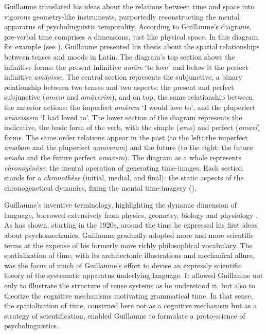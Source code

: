 \documentclass[english,output=paper,colorlinks,citecolor=brown]{../langscibook}
\begin{document}
Guillaume translated his ideas about the relations between time and space into vigorous geometry-like instruments, purportedly reconstructing the mental apparatus of psycholinguistic temporality. According to Guillaume’s diagrams, pre-verbal time comprises \textit{n} dimensions, just like physical space. In this diagram, for example (see ), Guillaume presented his thesis about the spatial relationships between tenses and moods in Latin. The diagram’s top section shows the infinitive forms: the present infinitive \textit{amāre} `to love' and below it the perfect infinitive \textit{am{āvisse}}. The central section represents the subjunctive, a binary relationship between two tenses and two aspects: the present and perfect subjunctive (\textit{amem} and \textit{amāverim}), and on top, the same relationship between the anterior actions: the imperfect \textit{amārem} `I would love to', and the pluperfect \textit{amāvissem} `I had loved to'. The lower section of the diagram represents the indicative, the basic form of the verb, with the simple (\textit{amo}) and perfect (\textit{amavi}) forms. The same order relations appear in the past (to the left: the imperfect \textit{amabam} and the pluperfect \textit{amaveram}) and the future (to the right: the future \textit{amabo} and the future perfect \textit{amavero}). The diagram as a whole represents \textit{chronogénèse}: the mental operation of generating time-images. Each section stands for a \textit{chronothèse} (initial, medial, and final): the static aspects of the chronogenetical dynamics, fixing the mental time-imagery (\citealt{BooneJoly1996}).

Guillaume’s inventive terminology, highlighting the dynamic dimension of language, borrowed extensively from physics, geometry, biology and physiology \citep{Bottineau2006}. As \citet{Valette2003} has shown, starting in the 1920s, around the time he expressed his first ideas about psychomechanics, Guillaume gradually adopted more and more scientific terms at the expense of his formerly more richly philosophical vocabulary. The spatialization of time, with its architectonic illustrations and mechanical allure, was the focus of much of Guillaume’s effort to devise an expressly scientific theory of the systematic apparatus underlying language. It allowed Guillaume not only to illustrate the structure of tense systems as he understood it, but also to theorize the cognitive mechanisms motivating grammatical time. In that sense, the spatialization of time, construed here not as a cognitive mechanism but as a strategy of scientification, enabled Guillaume to formulate a proto-science of psycholinguistics.
\end{document}
